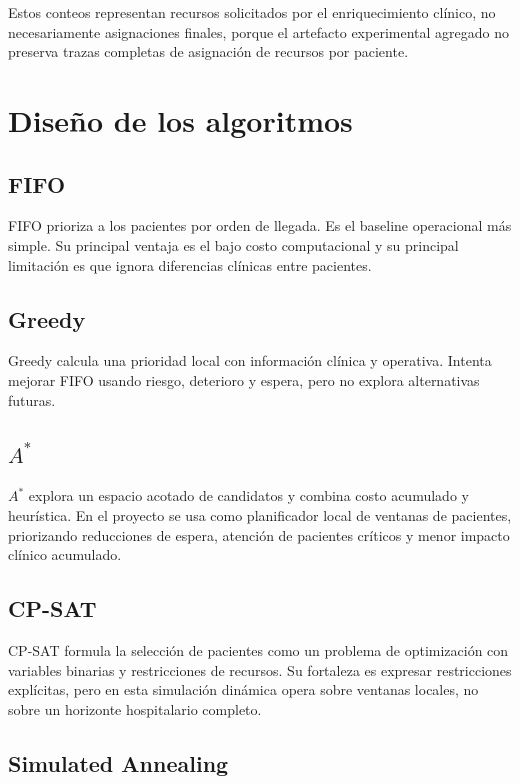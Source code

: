 \documentclass[12pt,a4paper]{article}
\begin{document}
Estos conteos representan recursos solicitados por el enriquecimiento clínico, no necesariamente asignaciones finales, porque el artefacto experimental agregado no preserva trazas completas de asignación de recursos por paciente.

\section{Diseño de los algoritmos}

\subsection{FIFO}

FIFO prioriza a los pacientes por orden de llegada. Es el baseline operacional más simple. Su principal ventaja es el bajo costo computacional y su principal limitación es que ignora diferencias clínicas entre pacientes.

\subsection{Greedy}

Greedy calcula una prioridad local con información clínica y operativa. Intenta mejorar FIFO usando riesgo, deterioro y espera, pero no explora alternativas futuras.

\subsection{$A^*$}

$A^*$ explora un espacio acotado de candidatos y combina costo acumulado y heurística. En el proyecto se usa como planificador local de ventanas de pacientes, priorizando reducciones de espera, atención de pacientes críticos y menor impacto clínico acumulado.

\subsection{CP-SAT}

CP-SAT formula la selección de pacientes como un problema de optimización con variables binarias y restricciones de recursos. Su fortaleza es expresar restricciones explícitas, pero en esta simulación dinámica opera sobre ventanas locales, no sobre un horizonte hospitalario completo.

\subsection{Simulated Annealing}
\end{document}
